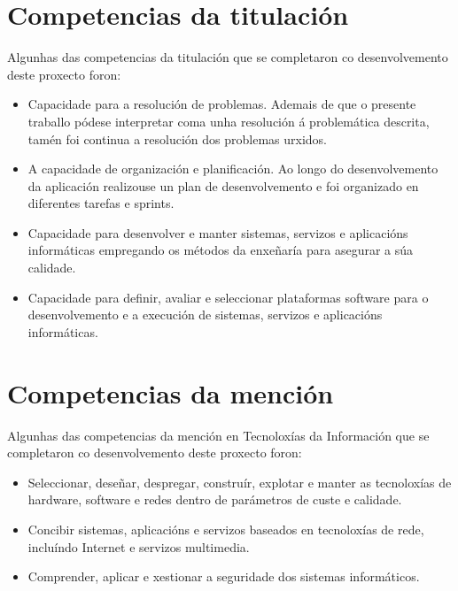 \section*{Competencias da titulación}
Algunhas das competencias da titulación que se completaron co desenvolvemento deste proxecto foron:
\begin{itemize}
	\item[--] Capacidade para a resolución de problemas. Ademais de que o presente traballo pódese interpretar coma unha resolución á problemática descrita, tamén foi continua a resolución dos problemas urxidos.
	\item[--] A capacidade de organización e planificación. Ao longo do desenvolvemento da aplicación realizouse un plan de desenvolvemento e foi organizado en diferentes tarefas e sprints.
	\item[--] Capacidade para desenvolver e manter sistemas, servizos e aplicacións informáticas empregando os métodos da enxeñaría para asegurar a súa calidade.
	\item[--] Capacidade para definir, avaliar e seleccionar plataformas software para o desenvolvemento e a execución de sistemas, servizos e aplicacións informáticas.
\end{itemize}

\section*{Competencias da mención}
Algunhas das competencias da mención en Tecnoloxías da Información que se completaron co desenvolvemento deste proxecto foron:
\begin{itemize}
	\item[--] Seleccionar, deseñar, despregar, construír, explotar e manter as tecnoloxías de hardware, software e redes dentro de parámetros de custe e calidade.
	\item[--] Concibir sistemas, aplicacións e servizos baseados en tecnoloxías de rede, incluíndo Internet e servizos multimedia.
	\item[--] Comprender, aplicar e xestionar a seguridade dos sistemas informáticos.
\end{itemize}

